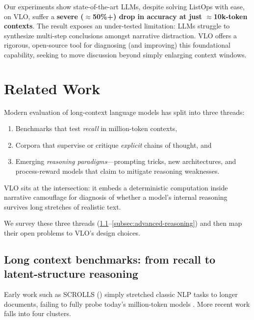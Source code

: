 \documentclass{article}
\begin{document}
Our experiments show state-of-the-art LLMs, despite solving ListOps with ease, on VLO, suffer a \textbf{severe ($\approx$50\%+) drop in accuracy at just $\approx$10k-token contexts}. The result exposes an under-tested limitation: LLMs struggle to synthesize multi-step conclusions amongst narrative distraction. VLO offers a rigorous, open-source tool for diagnosing (and improving) this foundational capability, seeking to move discussion beyond simply enlarging context windows.

\section{Related Work}
Modern evaluation of long-context language models has split into three threads:

\begin{enumerate}
  \item Benchmarks that test \textit{recall} in million-token contexts,
  \item Corpora that supervise or critique \textit{explicit} chains of thought, and
  \item Emerging \textit{reasoning paradigms}—prompting tricks, new architectures, and process-reward models that claim to mitigate reasoning weaknesses.
\end{enumerate}

VLO sits at the intersection: it embeds a deterministic computation inside narrative camouflage for diagnosis of whether a model's internal reasoning survives long stretches of realistic text.

We survey these three threads (\ref{subsec:long-context-benchmarks}–\ref{subsec:advanced-reasoning}) and then map their open problems to VLO's design choices.

\subsection{Long context benchmarks: from recall to latent-structure reasoning}
\label{subsec:long-context-benchmarks}
Early work such as SCROLLS (\citeyear{scrolls}) simply stretched classic NLP tasks to longer documents, failing to fully probe today's million-token models \citep{longbench2,gemini_15,gpt-41-docs}.  More recent work falls into four clusters.
\end{document}
